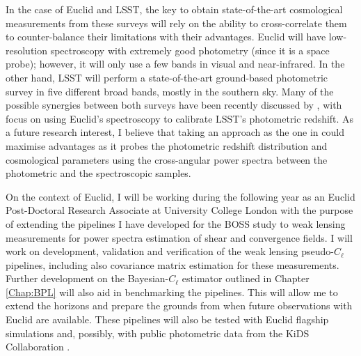 \qquad In the case of Euclid and LSST, the key to obtain state-of-the-art cosmological measurements from these surveys will rely on the ability to cross-correlate them to counter-balance their limitations with their advantages. Euclid will have low-resolution spectroscopy with extremely good photometry (since it is a space probe); however, it will only use a few bands in visual and near-infrared. In the other hand, LSST will perform a state-of-the-art ground-based photometric survey in five different broad bands, mostly in the southern sky. Many of the possible synergies between both surveys have been recently discussed by \cite{2017EuclidLSST}, with focus on using Euclid's spectroscopy to calibrate LSST's photometric redshift. As a future research interest, I believe that taking an approach as the one in \cite{2016McLeod} could maximise advantages as it probes the photometric redshift distribution and cosmological parameters using the cross-angular power spectra between the photometric and the spectroscopic samples. 

\qquad On the context of Euclid, I will be working during the following year as an Euclid Post-Doctoral Research Associate at University College London with the purpose of extending the pipelines I have developed for the BOSS study to weak lensing measurements for power spectra estimation of shear and convergence fields. I will work on development, validation and verification of the weak lensing pseudo-$C_{\ell}$ pipelines, including also covariance matrix estimation for these measurements. Further development on the Bayesian-$C_{\ell}$ estimator outlined in Chapter \ref{Chap:BPL} will also aid in benchmarking the pipelines. This will allow me to extend the horizons and prepare the grounds from when future observations with Euclid are available. These pipelines will also be tested with Euclid flagship simulations and, possibly, with public photometric data from the KiDS Collaboration \citep{2017KiDS-DR3}.

